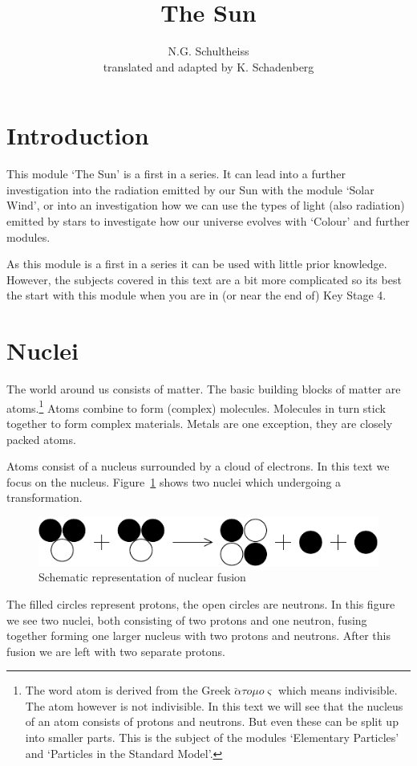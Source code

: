 \documentclass[12pt,a4paper]{article}
\author{N.G. Schultheiss \\ translated and adapted by K. Schadenberg}
\date{}
\title{The Sun}
\numberwithin{equation}{section}
\numberwithin{figure}{section}
\numberwithin{table}{section}
\begin{document}
\maketitle

\section{Introduction}
This module `The Sun' is a first in a series. It can lead into a further investigation into the radiation emitted by our Sun with the module `Solar Wind', or into an investigation how we can use the types of light (also radiation) emitted by stars to investigate how our universe evolves with `Colour' and further modules.

As this module is a first in a series it can be used with little prior knowledge. However, the subjects covered in this text are a bit more complicated so its best the start with this module when you are in (or near the end of) Key Stage 4.

\section{Nuclei}
The world around us consists of matter. The basic building blocks of matter are atoms.\footnote{The word atom is derived from the Greek $\breve{\alpha}\tau o \mu o \varsigma$ which means indivisible. The atom however is not indivisible. In this text we will see that the nucleus of an atom consists of protons and neutrons. But even these can be split up into smaller parts. This is the subject of the modules `Elementary Particles' and `Particles in the Standard Model'.} Atoms combine to form (complex) molecules. Molecules in turn stick together to form complex materials. Metals are one exception, they are closely packed atoms.

Atoms consist of a nucleus surrounded by a cloud of electrons. In this text we focus on the nucleus. Figure~\ref{fig:fusion_schem} shows two nuclei which undergoing a transformation.
\begin{figure}\begin{center}
\includegraphics[scale=1]{fusion.pdf}%
\caption{Schematic representation of nuclear fusion}\label{fig:fusion_schem}
\end{center}\end{figure}
The filled circles represent protons, the open circles are neutrons. In this figure we see two nuclei, both consisting of two protons and one neutron, fusing together forming one larger nucleus with two protons and neutrons. After this fusion we are left with two separate protons.
\end{document}

